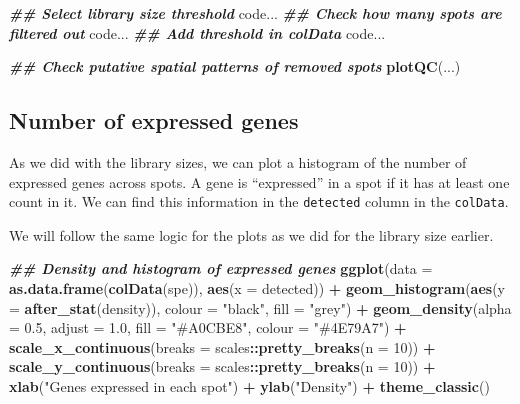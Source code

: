 \documentclass[
]{book}
\newenvironment{Shaded}{\begin{snugshade}}{\end{snugshade}}
\newcommand{\AttributeTok}[1]{\textcolor[rgb]{0.13,0.29,0.53}{#1}}
\newcommand{\DecValTok}[1]{\textcolor[rgb]{0.00,0.00,0.81}{#1}}
\newcommand{\DocumentationTok}[1]{\textcolor[rgb]{0.56,0.35,0.01}{\textbf{\textit{#1}}}}
\newcommand{\FloatTok}[1]{\textcolor[rgb]{0.00,0.00,0.81}{#1}}
\newcommand{\FunctionTok}[1]{\textcolor[rgb]{0.13,0.29,0.53}{\textbf{#1}}}
\newcommand{\NormalTok}[1]{#1}
\newcommand{\SpecialCharTok}[1]{\textcolor[rgb]{0.81,0.36,0.00}{\textbf{#1}}}
\newcommand{\StringTok}[1]{\textcolor[rgb]{0.31,0.60,0.02}{#1}}
\begin{document}
\begin{Shaded}
\begin{Highlighting}[]
\DocumentationTok{\#\# Select library size threshold}
\NormalTok{code...}
\DocumentationTok{\#\# Check how many spots are filtered out}
\NormalTok{code...}
\DocumentationTok{\#\# Add threshold in colData}
\NormalTok{code...}

\DocumentationTok{\#\# Check putative spatial patterns of removed spots}
\FunctionTok{plotQC}\NormalTok{(...)}
\end{Highlighting}
\end{Shaded}

\hypertarget{number-of-expressed-genes}{%
\subsection{Number of expressed genes}\label{number-of-expressed-genes}}

As we did with the library sizes, we can plot a histogram of the number of expressed genes across spots. A gene is ``expressed'' in a spot if it has at least one count in it. We can find this information in the \texttt{detected} column in the \texttt{colData}.

We will follow the same logic for the plots as we did for the library size earlier.

\begin{Shaded}
\begin{Highlighting}[]
\DocumentationTok{\#\# Density and histogram of expressed genes}
\FunctionTok{ggplot}\NormalTok{(}\AttributeTok{data =} \FunctionTok{as.data.frame}\NormalTok{(}\FunctionTok{colData}\NormalTok{(spe)),}
       \FunctionTok{aes}\NormalTok{(}\AttributeTok{x =}\NormalTok{ detected)) }\SpecialCharTok{+}
  \FunctionTok{geom\_histogram}\NormalTok{(}\FunctionTok{aes}\NormalTok{(}\AttributeTok{y =} \FunctionTok{after\_stat}\NormalTok{(density)), }
                 \AttributeTok{colour =} \StringTok{"black"}\NormalTok{, }
                 \AttributeTok{fill =} \StringTok{"grey"}\NormalTok{) }\SpecialCharTok{+}
  \FunctionTok{geom\_density}\NormalTok{(}\AttributeTok{alpha =} \FloatTok{0.5}\NormalTok{,}
               \AttributeTok{adjust =} \FloatTok{1.0}\NormalTok{,}
               \AttributeTok{fill =} \StringTok{"\#A0CBE8"}\NormalTok{,}
               \AttributeTok{colour =} \StringTok{"\#4E79A7"}\NormalTok{) }\SpecialCharTok{+}
  \FunctionTok{scale\_x\_continuous}\NormalTok{(}\AttributeTok{breaks =}\NormalTok{ scales}\SpecialCharTok{::}\FunctionTok{pretty\_breaks}\NormalTok{(}\AttributeTok{n =} \DecValTok{10}\NormalTok{)) }\SpecialCharTok{+} 
  \FunctionTok{scale\_y\_continuous}\NormalTok{(}\AttributeTok{breaks =}\NormalTok{ scales}\SpecialCharTok{::}\FunctionTok{pretty\_breaks}\NormalTok{(}\AttributeTok{n =} \DecValTok{10}\NormalTok{)) }\SpecialCharTok{+} 
  \FunctionTok{xlab}\NormalTok{(}\StringTok{"Genes expressed in each spot"}\NormalTok{) }\SpecialCharTok{+} 
  \FunctionTok{ylab}\NormalTok{(}\StringTok{"Density"}\NormalTok{) }\SpecialCharTok{+} 
  \FunctionTok{theme\_classic}\NormalTok{()}
\end{Highlighting}
\end{Shaded}
\end{document}
